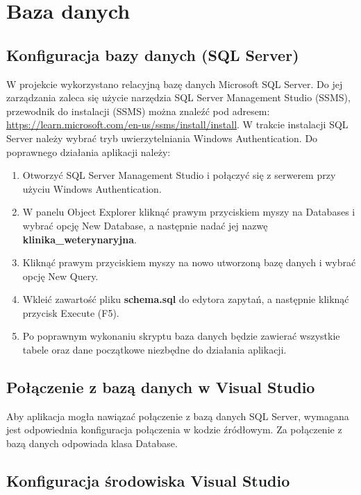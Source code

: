 \section{Baza danych}
\subsection{Konfiguracja bazy danych (SQL Server)}

W projekcie wykorzystano relacyjną bazę danych Microsoft SQL Server. 
Do jej zarządzania zaleca się użycie narzędzia SQL Server Management 
Studio (SSMS), przewodnik do instalacji (SSMS) można znaleźć pod adresem: 
\url{https://learn.microsoft.com/en-us/ssms/install/install}. W trakcie instalacji 
SQL Server należy wybrać tryb uwierzytelniania Windows 
Authentication. Do poprawnego działania aplikacji należy:

\begin{enumerate}
    \item Otworzyć SQL Server Management Studio i połączyć się z serwerem przy użyciu Windows Authentication.
    \item W panelu Object Explorer kliknąć prawym przyciskiem myszy na Databases i wybrać opcję New Database, a następnie nadać jej nazwę \textbf{klinika\_weterynaryjna}.
    \item Kliknąć prawym przyciskiem myszy na nowo utworzoną bazę danych i wybrać opcję New Query.
    \item Wkleić zawartość pliku \textbf{schema.sql} do edytora zapytań, a następnie kliknąć przycisk Execute (F5).
    \item Po poprawnym wykonaniu skryptu baza danych będzie zawierać wszystkie tabele oraz dane początkowe niezbędne do działania aplikacji.
\end{enumerate}

\subsection{Połączenie z bazą danych w Visual Studio}

Aby aplikacja mogła nawiązać połączenie z bazą danych 
SQL Server, wymagana jest odpowiednia konfiguracja połączenia w 
kodzie źródłowym. Za połączenie z bazą danych odpowiada klasa Database.



\subsection{Konfiguracja środowiska Visual Studio}

